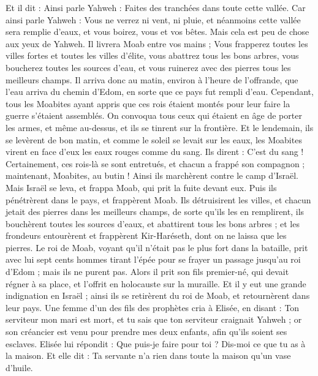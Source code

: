 \begin{multicols}{2}
Et il dit : Ainsi parle Yahweh : Faites des tranchées dans toute cette vallée.
Car ainsi parle Yahweh : Vous ne verrez ni vent, ni pluie, et néanmoins cette vallée sera remplie d’eaux, et vous boirez, vous et vos bêtes.
Mais cela est peu de chose aux yeux de Yahweh. Il livrera Moab entre vos mains ;
Vous frapperez toutes les villes fortes et toutes les villes d’élite, vous abattrez tous les bons arbres, vous boucherez toutes les sources d’eau, et vous ruinerez avec des pierres tous les meilleurs champs.
Il arriva donc au matin, environ à l’heure de l’offrande, que l’eau arriva du chemin d’Edom, en sorte que ce pays fut rempli d’eau.
Cependant, tous les Moabites ayant appris que ces rois étaient montés pour leur faire la guerre s’étaient assemblés. On convoqua tous ceux qui étaient en âge de porter les armes, et même au-dessus, et ils se tinrent sur la frontière.
Et le lendemain, ils se levèrent de bon matin, et comme le soleil se levait sur les eaux, les Moabites virent en face d’eux les eaux rouges comme du sang.
Ils dirent : C’est du sang ! Certainement, ces rois-là se sont entretués, et chacun a frappé son compagnon ; maintenant, Moabites, au butin !
Ainsi ils marchèrent contre le camp d’Israël. Mais Israël se leva, et frappa Moab, qui prit la fuite devant eux. Puis ils pénétrèrent dans le pays, et frappèrent Moab.
Ils détruisirent les villes, et chacun jetait des pierres dans les meilleurs champs, de sorte qu’ils les en remplirent, ils bouchèrent toutes les sources d’eaux, et abattirent tous les bons arbres ; et les frondeurs entourèrent et frappèrent Kir-Haréseth, dont on ne laissa que les pierres.
Le roi de Moab, voyant qu’il n’était pas le plus fort dans la bataille, prit avec lui sept cents hommes tirant l’épée pour se frayer un passage jusqu’au roi d’Edom ; mais ils ne purent pas.
Alors il prit son fils premier-né, qui devait régner à sa place, et l’offrit en holocauste sur la muraille. Et il y eut une grande indignation en Israël ; ainsi ils se retirèrent du roi de Moab, et retournèrent dans leur pays.
\VerseOne{}Une femme d’un des fils des prophètes cria à Elisée, en disant : Ton serviteur mon mari est mort, et tu sais que ton serviteur craignait Yahweh ; or son créancier est venu pour prendre mes deux enfants, afin qu’ils soient ses esclaves.
Elisée lui répondit : Que puis-je faire pour toi ? Dis-moi ce que tu as à la maison. Et elle dit : Ta servante n’a rien dans toute la maison qu’un vase d’huile.

\end{multicols}
